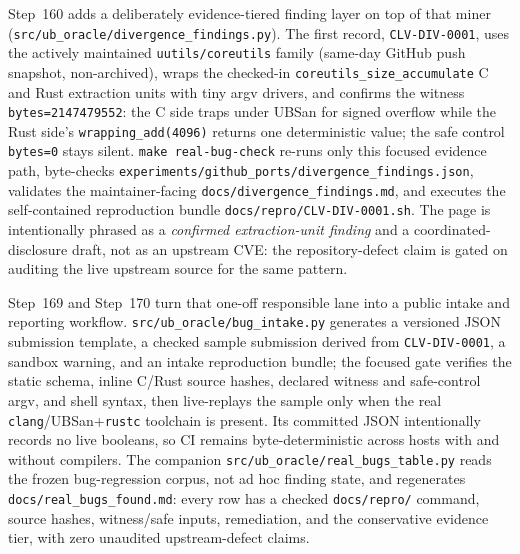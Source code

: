 \documentclass[10pt,a4paper]{article}
\begin{document}
Step~160 adds a deliberately evidence-tiered finding layer on top of that miner
(\texttt{src/ub\_oracle/divergence\_findings.py}).  The first record,
\texttt{CLV-DIV-0001}, uses the actively maintained
\texttt{uutils/coreutils} family (same-day GitHub push snapshot, non-archived),
wraps the checked-in \texttt{coreutils\_size\_accumulate} C and Rust extraction
units with tiny argv drivers, and confirms the witness
\texttt{bytes=2147479552}: the C side traps under UBSan for signed overflow while
the Rust side's \texttt{wrapping\_add(4096)} returns one deterministic value; the
safe control \texttt{bytes=0} stays silent.  \texttt{make real-bug-check}
re-runs only this focused evidence path, byte-checks
\texttt{experiments/github\_ports/divergence\_findings.json}, validates the
maintainer-facing \texttt{docs/divergence\_findings.md}, and executes the
self-contained reproduction bundle \texttt{docs/repro/CLV-DIV-0001.sh}.  The page
is intentionally phrased as a \emph{confirmed extraction-unit finding} and a
coordinated-disclosure draft, not as an upstream CVE: the repository-defect claim
is gated on auditing the live upstream source for the same pattern.

Step~169 and Step~170 turn that one-off responsible lane into a public intake and
reporting workflow.  \texttt{src/ub\_oracle/bug\_intake.py} generates a
versioned JSON submission template, a checked sample submission derived from
\texttt{CLV-DIV-0001}, a sandbox warning, and an intake reproduction bundle; the
focused gate verifies the static schema, inline C/Rust source hashes, declared
witness and safe-control argv, and shell syntax, then live-replays the sample only
when the real \texttt{clang}/UBSan+\texttt{rustc} toolchain is present.  Its
committed JSON intentionally records no live booleans, so CI remains
byte-deterministic across hosts with and without compilers.  The companion
\texttt{src/ub\_oracle/real\_bugs\_table.py} reads the frozen
bug-regression corpus, not ad hoc finding state, and regenerates
\texttt{docs/real\_bugs\_found.md}: every row has a checked
\texttt{docs/repro/} command, source hashes, witness/safe inputs, remediation, and
the conservative evidence tier, with zero unaudited upstream-defect claims.
\end{document}
